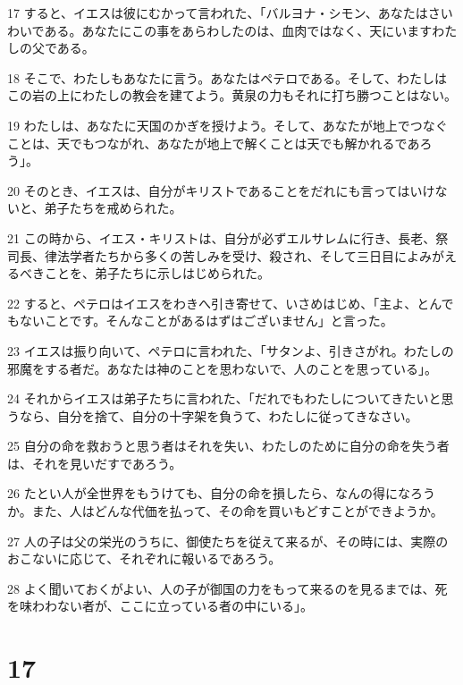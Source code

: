 \par 17 すると、イエスは彼にむかって言われた、「バルヨナ・シモン、あなたはさいわいである。あなたにこの事をあらわしたのは、血肉ではなく、天にいますわたしの父である。
\par 18 そこで、わたしもあなたに言う。あなたはペテロである。そして、わたしはこの岩の上にわたしの教会を建てよう。黄泉の力もそれに打ち勝つことはない。
\par 19 わたしは、あなたに天国のかぎを授けよう。そして、あなたが地上でつなぐことは、天でもつながれ、あなたが地上で解くことは天でも解かれるであろう」。
\par 20 そのとき、イエスは、自分がキリストであることをだれにも言ってはいけないと、弟子たちを戒められた。
\par 21 この時から、イエス・キリストは、自分が必ずエルサレムに行き、長老、祭司長、律法学者たちから多くの苦しみを受け、殺され、そして三日目によみがえるべきことを、弟子たちに示しはじめられた。
\par 22 すると、ペテロはイエスをわきへ引き寄せて、いさめはじめ、「主よ、とんでもないことです。そんなことがあるはずはございません」と言った。
\par 23 イエスは振り向いて、ペテロに言われた、「サタンよ、引きさがれ。わたしの邪魔をする者だ。あなたは神のことを思わないで、人のことを思っている」。
\par 24 それからイエスは弟子たちに言われた、「だれでもわたしについてきたいと思うなら、自分を捨て、自分の十字架を負うて、わたしに従ってきなさい。
\par 25 自分の命を救おうと思う者はそれを失い、わたしのために自分の命を失う者は、それを見いだすであろう。
\par 26 たとい人が全世界をもうけても、自分の命を損したら、なんの得になろうか。また、人はどんな代価を払って、その命を買いもどすことができようか。
\par 27 人の子は父の栄光のうちに、御使たちを従えて来るが、その時には、実際のおこないに応じて、それぞれに報いるであろう。
\par 28 よく聞いておくがよい、人の子が御国の力をもって来るのを見るまでは、死を味わわない者が、ここに立っている者の中にいる」。

\chapter{17}

